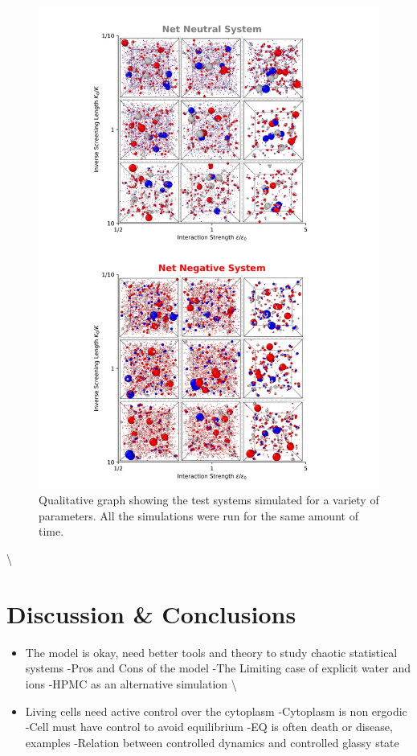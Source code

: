 \documentclass[a4paper,11pt,oneside]{book}
\begin{document}
\begin{figure}[!htbp]
\centering
\includegraphics[width=0.7\linewidth]{files/Fig9-b4858396f6517661b798f42ca198a015.png}
\caption[]{Qualitative graph showing the test systems simulated for a variety of parameters. All the simulations were run for the same amount of time.}
\label{Fig9ParamScan}
\end{figure}

{\textbackslash}

\section{Discussion \& Conclusions}

\begin{itemize}
\item The model is okay, need better tools and theory to study chaotic statistical systems\newline
-Pros and Cons of the model\newline
-The Limiting case of explicit water and ions\newline
-HPMC as an alternative simulation
{\textbackslash}
\item Living cells need active control over the cytoplasm\newline
-Cytoplasm is non ergodic\newline
-Cell must have control to avoid equilibrium\newline
-EQ is often death or disease, examples\newline
-Relation between controlled dynamics and controlled glassy state
\end{itemize}
\end{document}
